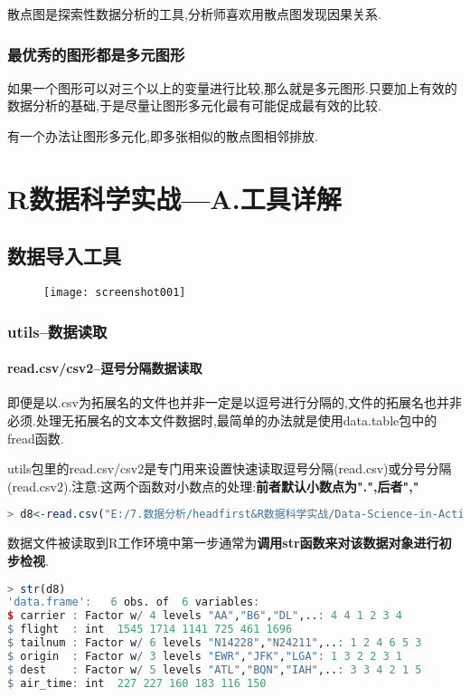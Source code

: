 \documentclass[11pt,a4paper,oneside]{book}
\begin{document}
散点图是探索性数据分析的工具,分析师喜欢用散点图发现因果关系.
\section{最优秀的图形都是多元图形}
如果一个图形可以对三个以上的变量进行比较,那么就是多元图形.只要加上有效的数据分析的基础,于是尽量让图形多元化最有可能促成最有效的比较.

有一个办法让图形多元化,即多张相似的散点图相邻排放.

\part{R数据科学实战---A.工具详解}
\chapter{数据导入工具}
\begin{figure}[H]
	\centering
	\texttt{[image: screenshot001]}
\end{figure}

\section{utils--数据读取}
\subsection{read.csv/csv2--逗号分隔数据读取}
即便是以.csv为拓展名的文件也并非一定是以逗号进行分隔的,文件的拓展名也并非必须.处理无拓展名的文本文件数据时,最简单的办法就是使用data.table包中的fread函数.

utils包里的read.csv/csv2是专门用来设置快速读取逗号分隔(read.csv)或分号分隔(read.csv2).注意:这两个函数对小数点的处理:\textbf{前者默认小数点为".",后者","}

\begin{lstlisting}[language=r]
> d8<-read.csv("E:/7.数据分析/headfirst&R数据科学实战/Data-Science-in-Action-R-Tools-and-Case-Studies-master/chapter1/RawData/flights.csv",header=TRUE)
\end{lstlisting}

数据文件被读取到R工作环境中第一步通常为\textbf{调用str函数来对该数据对象进行初步检视}.
\begin{lstlisting}[language=r]
> str(d8)
'data.frame':	6 obs. of  6 variables:
$ carrier : Factor w/ 4 levels "AA","B6","DL",..: 4 4 1 2 3 4
$ flight  : int  1545 1714 1141 725 461 1696
$ tailnum : Factor w/ 6 levels "N14228","N24211",..: 1 2 4 6 5 3
$ origin  : Factor w/ 3 levels "EWR","JFK","LGA": 1 3 2 2 3 1
$ dest    : Factor w/ 5 levels "ATL","BQN","IAH",..: 3 3 4 2 1 5
$ air_time: int  227 227 160 183 116 150
\end{lstlisting}
\end{document}
